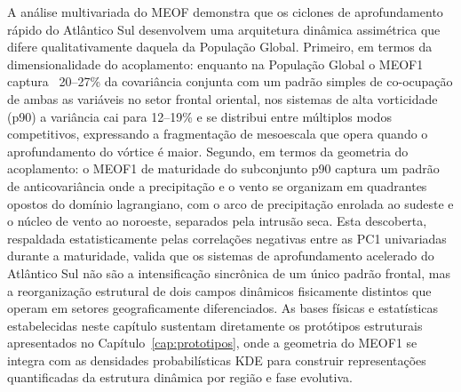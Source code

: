 A análise multivariada do MEOF demonstra que os ciclones de aprofundamento rápido do Atlântico Sul desenvolvem uma arquitetura dinâmica assimétrica que difere qualitativamente daquela da População Global. 
Primeiro, em termos da dimensionalidade do acoplamento: enquanto na População Global o MEOF1 captura ~20--27\% da covariância conjunta com um padrão simples de co-ocupação de ambas as variáveis no setor frontal oriental, nos sistemas de alta vorticidade (p90) a variância cai para 12--19\% e se distribui entre múltiplos modos competitivos, expressando a fragmentação de mesoescala que opera quando o aprofundamento do vórtice é maior.
Segundo, em termos da geometria do acoplamento: o MEOF1 de maturidade do subconjunto p90 captura um padrão de anticovariância onde a precipitação e o vento se organizam em quadrantes opostos do domínio lagrangiano, com o arco de precipitação enrolada ao sudeste e o núcleo de vento ao noroeste, separados pela intrusão seca.
Esta descoberta, respaldada estatisticamente pelas correlações negativas entre as PC1 univariadas durante a maturidade, valida que os sistemas de aprofundamento acelerado do Atlântico Sul não são a intensificação sincrônica de um único padrão frontal, mas a reorganização estrutural de dois campos dinâmicos fisicamente distintos que operam em setores geograficamente diferenciados.
As bases físicas e estatísticas estabelecidas neste capítulo sustentam diretamente os protótipos estruturais apresentados no Capítulo~\ref{cap:prototipos}, onde a geometria do MEOF1 se integra com as densidades probabilísticas KDE para construir representações quantificadas da estrutura dinâmica por região e fase evolutiva.